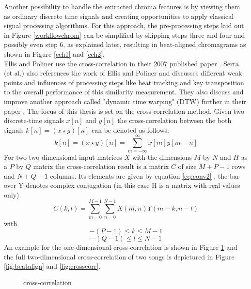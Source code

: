 Another possibility to handle the extracted chroma features is by viewing them as ordinary discrete time signals and creating opportunities to apply classical signal processing algorithms. For this approach, the pre-processing steps laid out in Figure \ref{workflowchrom} can be simplified by skipping steps three and four and possibly even step 6, as explained later, resulting in beat-aligned chromagrams as shown in Figure \ref{cch1} and \ref{cch2}.\\
Ellis and Poliner use the cross-correlation in their 2007 published paper \cite{chroma3}. Serra (et al.) also references the work of Ellis and Poliner and discusses different weak points and influences of processing steps like beat tracking and key transposition to the overall performance of this similarity measurement. 
They also discuss and improve another approach called "dynamic time warping" (DTW) further in their paper \cite{chroma2}. The focus of this thesis is set on the cross-correlation method. 
Given two discrete-time signals $x[n]$ and $y[n]$ the cross-correlation between the both signals $k[n] = (x \star y)[n]$ can be denoted as follows:
\begin{equation} \label{eq:conv1}
k[n] = (x \star y)[n] = \sum_{m = -\infty}^{\infty}{x[m] y[m - n]} 
\end{equation}
For two two-dimensional input matrices $X$ with the dimensions $M$ by $N$ and $H$ as a $P$ by $Q$ matrix the cross-correlation result is a matrix $C$ of size $M + P - 1$ rows and $N + Q - 1$ columns. Its elements are given by equation \ref{eq:conv2} \cite{mathcorr}, the bar over Y denotes complex conjugation (in this case H is a matrix with real values only). 
\begin{equation} \label{eq:conv2}
C(k, l) = \sum_{m = 0}^{M - 1}{\sum_{n = 0}^{N - 1}{X(m, n)\overline{Y}(m - k, n - l)}}
\end{equation}
with 
\begin{equation} \label{eq:conv3}
-(P - 1) \leq k \leq M - 1
\end{equation}
\begin{equation} \label{eq:conv4}
-(Q - 1) \leq l \leq N - 1
\end{equation}
An example for the one-dimensional cross-correlation is shown in Figure \ref{fig:corr1} and the full two-dimensional cross-correlation of two songs is depictured in Figure \ref{fig:beatalign} and \ref{fig:crosscorr}.
\begin{figure}[htbp]
	\centering
	\caption{cross-correlation}
	\label{fig:corr1}
\end{figure}
